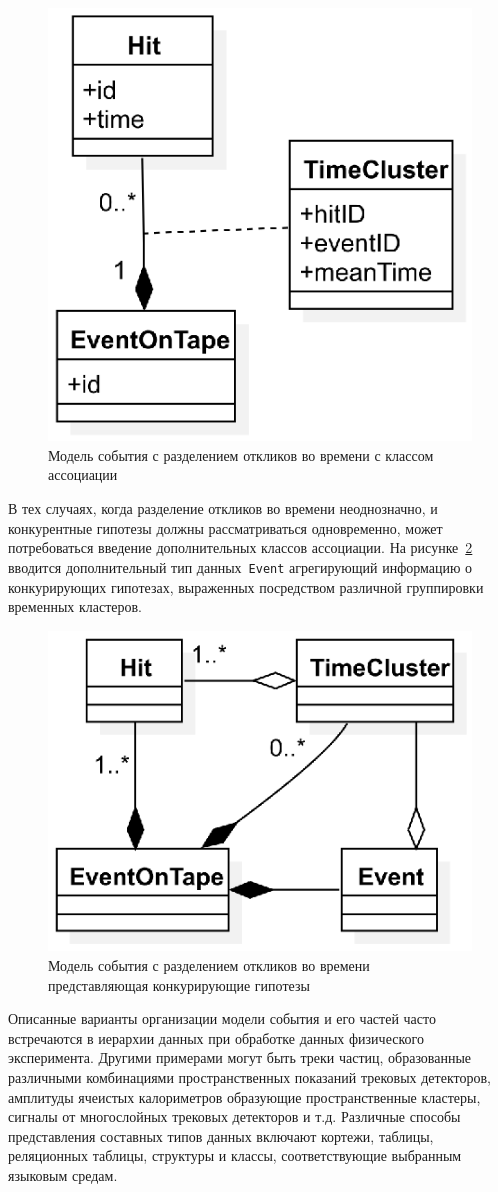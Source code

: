 \begin{figure}[ht!]
    \centering
    \includegraphics[width=0.33\linewidth]{images/illustrative/hit-assoc.eps}
    \caption{Модель события с разделением откликов во времени с классом ассоциации}
    \label{fig:complex-hit-event}
\end{figure}

В тех случаях, когда разделение откликов во времени неоднозначно, и конкурентные
гипотезы должны рассматриваться одновременно, может потребоваться введение
дополнительных классов ассоциации. На рисунке~\ref{fig:more-complex-hit-event}
вводится дополнительный тип данных~\texttt{Event} агрегирующий информацию о
конкурирующих гипотезах, выраженных посредством различной группировки
временных кластеров.

\begin{figure}[ht!]
    \centering
    \includegraphics[width=0.33\linewidth]{images/illustrative/more-complex-event.eps}
    \caption{Модель события с разделением откликов во времени представляющая конкурирующие гипотезы}
    \label{fig:more-complex-hit-event}
\end{figure}

Описанные варианты организации модели события и его частей часто встречаются в
иерархии данных при обработке данных физического эксперимента. Другими примерами
могут быть треки частиц, образованные различными комбинациями пространственных
показаний трековых детекторов, амплитуды ячеистых калориметров образующие
пространственные кластеры, сигналы от многослойных трековых детекторов и т.д.
Различные способы представления составных типов данных включают кортежи,
таблицы, реляционных таблицы, структуры и классы, соответствующие выбранным
языковым средам.

